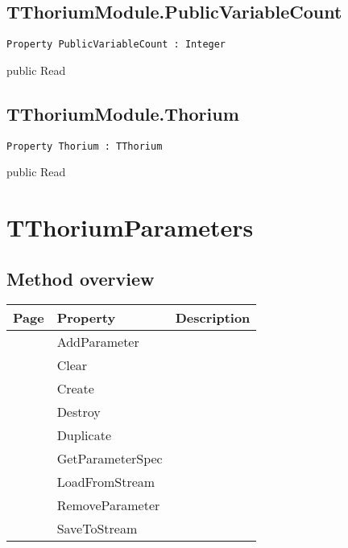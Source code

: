 \subsection{TThoriumModule.PublicVariableCount}
\label{thoriumcore:thorium:tthoriummodule:publicvariablecount}
\begin{FPCList}
\Synopsis
\Declaration 

\begin{verbatim}
Property PublicVariableCount : Integer
\end{verbatim}
\Visibility
public
\Access
Read
\Description
\end{FPCList}
\subsection{TThoriumModule.Thorium}
\label{thoriumcore:thorium:tthoriummodule:thorium}
\begin{FPCList}
\Synopsis
\Declaration 

\begin{verbatim}
Property Thorium : TThorium
\end{verbatim}
\Visibility
public
\Access
Read
\Description
\end{FPCList}
\section{TThoriumParameters}
\label{thoriumcore:thorium:tthoriumparameters}
\subsection{Method overview}
\label{thoriumcore:thorium:tthoriumparameters:methods}
\begin{tabularx}{\textwidth}{llX}
Page & Property & Description  \\ \hline
\pageref{thoriumcore:thorium:tthoriumparameters:addparameter} & AddParameter  &  \\
\pageref{thoriumcore:thorium:tthoriumparameters:clear} & Clear  &  \\
\pageref{thoriumcore:thorium:tthoriumparameters:create} & Create  &  \\
\pageref{thoriumcore:thorium:tthoriumparameters:destroy} & Destroy  &  \\
\pageref{thoriumcore:thorium:tthoriumparameters:duplicate} & Duplicate  &  \\
\pageref{thoriumcore:thorium:tthoriumparameters:getparameterspec} & GetParameterSpec  &  \\
\pageref{thoriumcore:thorium:tthoriumparameters:loadfromstream} & LoadFromStream  &  \\
\pageref{thoriumcore:thorium:tthoriumparameters:removeparameter} & RemoveParameter  &  \\
\pageref{thoriumcore:thorium:tthoriumparameters:savetostream} & SaveToStream  &  \\
\hline
\end{tabularx}
